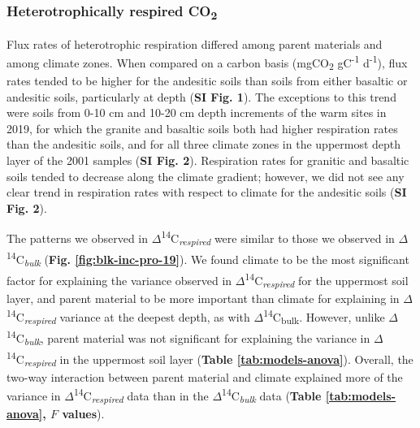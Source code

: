 \documentclass[english,man,floatsintext]{apa6}
\begin{document}
\hypertarget{heterotrophically-respired-co2}{%
\subsubsection{\texorpdfstring{Heterotrophically respired CO\textsubscript{2}}{Heterotrophically respired CO2}}\label{heterotrophically-respired-co2}}

Flux rates of heterotrophic respiration differed among parent materials and among climate zones. When compared on a carbon basis (mgCO\textsubscript{2} gC\textsuperscript{-1} d\textsuperscript{-1}), flux rates tended to be higher for the andesitic soils than soils from either basaltic or andesitic soils, particularly at depth (\textbf{SI Fig. 1}). The exceptions to this trend were soils from 0-10 cm and 10-20 cm depth increments of the warm sites in 2019, for which the granite and basaltic soils both had higher respiration rates than the andesitic soils, and for all three climate zones in the uppermost depth layer of the 2001 samples (\textbf{SI Fig. 2}). Respiration rates for granitic and basaltic soils tended to decrease along the climate gradient; however, we did not see any clear trend in respiration rates with respect to climate for the andesitic soils (\textbf{SI Fig. 2}).

The patterns we observed in \(\Delta\)\textsuperscript{14}C\textsubscript{\emph{respired}} were similar to those we observed in \(\Delta\)\textsuperscript{14}C\textsubscript{\emph{bulk}} (\textbf{Fig. \ref{fig:blk-inc-pro-19}}). We found climate to be the most significant factor for explaining the variance observed in \(\Delta\)\textsuperscript{14}C\textsubscript{\emph{respired}} for the uppermost soil layer, and parent material to be more important than climate for explaining in \(\Delta\)\textsuperscript{14}C\textsubscript{\emph{respired}} variance at the deepest depth, as with \(\Delta\)\textsuperscript{14}C\textsubscript{bulk}. However, unlike \(\Delta\)\textsuperscript{14}C\textsubscript{\emph{bulk}}, parent material was not significant for explaining the variance in \(\Delta\)\textsuperscript{14}C\textsubscript{\emph{respired}} in the uppermost soil layer (\textbf{Table \ref{tab:models-anova}}). Overall, the two-way interaction between parent material and climate explained more of the variance in \(\Delta\)\textsuperscript{14}C\textsubscript{\emph{respired}} data than in the \(\Delta\)\textsuperscript{14}C\textsubscript{\emph{bulk}} data (\textbf{Table \ref{tab:models-anova}, \(F\) values}).
\end{document}
